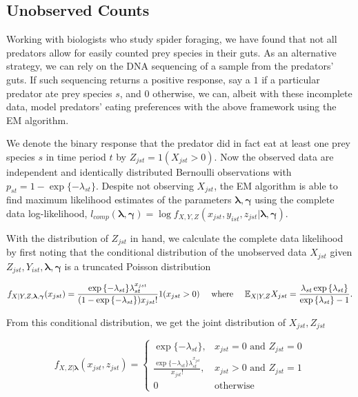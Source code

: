 \subsection{Unobserved Counts}

Working with biologists who study spider foraging, we have found that not all predators allow for easily counted prey species in their guts.  As an alternative strategy, we can rely on the DNA sequencing of a sample from the predators' guts.  If such sequencing returns a positive response, say a $1$ if a particular predator ate prey species $s$, and $0$ otherwise, we can, albeit with these incomplete data, model predators' eating preferences with the above framework using the EM algorithm.  

We denote the binary response that the predator did in fact eat at least one prey species $s$ in time period $t$ by $Z_{jst} = 1(X_{jst} > 0)$.  Now the observed data are independent and identically distributed Bernoulli observations with $p_{st} = 1-\exp\{-\lambda_{st}\}$.  Despite not observing $X_{jst}$, the EM algorithm is able to find maximum likelihood estimates of the parameters $\boldsymbol{\lambda}, \boldsymbol{\gamma}$ using the complete data log-likelihood, $l_{comp}(\boldsymbol{\lambda}, \boldsymbol{\gamma}) = \log f_{X,Y,Z}(x_{jst},y_{ist},z_{jst}|\boldsymbol{\lambda}, \boldsymbol{\gamma})$.

With the distribution of $Z_{jst}$ in hand, we calculate the complete data likelihood by first noting that the conditional distribution of the unobserved data $X_{jst}$ given $Z_{jst}, Y_{ist}, \boldsymbol{\lambda}, \boldsymbol{\gamma}$ is a truncated Poisson distribution

\begin{equation*}
  f_{X|Y,Z,\boldsymbol{\lambda},\boldsymbol{\gamma}}(x_{jst}) =
  \frac{\exp{\{-\lambda_{st}\}} \lambda_{st}^{x_{jst}}}{(1 - \exp{\{-\lambda_{st}\}}) x_{jst}!}1(x_{jst} > 0) \quad \text{ where } \quad \mathbb{E}_{X|Y,Z}X_{jst} = \frac{\lambda_{st} \exp{\{\lambda_{st} \}}}{\exp{\{ \lambda_{st} \}} - 1}.
\end{equation*}

\noindent From this conditional distribution, we get the joint distribution of $X_{jst}, Z_{jst}$

\begin{equation*}
    f_{X,Z|\boldsymbol{\lambda}}(x_{jst},z_{jst}) = \left\{
    \begin{array}{lr}
      \exp{\{ -\lambda_{st} \}}, & x_{jst}=0 \mbox{ and } Z_{jst} = 0 \\
      \frac{\exp{\{-\lambda_{st} \}} \lambda_{st}^{x_{jst}}}{x_{jst}!}, & x_{jst} > 0 \mbox{ and } Z_{jst} = 1\\
      0 & \mbox{otherwise}
    \end{array}
  \right.
\end{equation*}

